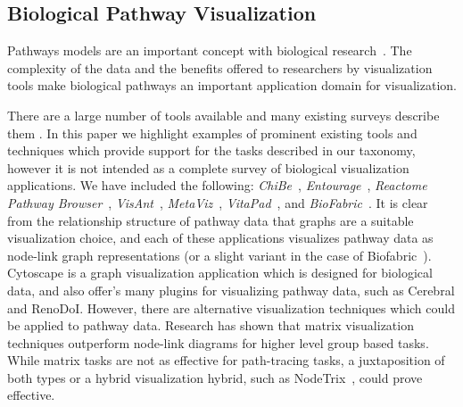 \subsection*{Biological Pathway Visualization}


Pathways models are an important concept with biological research~\cite{cairns2011regulation, luo2003targeting,reya2001stem}.
The complexity of the data and the benefits offered to researchers by visualization tools make biological pathways an important application domain for visualization.


There are a large number of tools available and many existing surveys describe them \cite{Suderman2007tools,pavlopoulos2008survey,Gehlenborg2010omics}.
In this paper we highlight examples of prominent existing tools and techniques which provide support for the tasks described in our taxonomy, however it is not intended as a complete survey of biological visualization applications.
We have included the following: \textit{ChiBe}~\cite{Babur2010chibe}, \textit{Entourage}~\cite{Lex2013entourage}, \textit{Reactome Pathway Browser}~\cite{croft2014reactome}, \textit{VisAnt}~\cite{hu2004visant}, \textit{MetaViz}~\cite{bourqui2007metabolic}, \textit{VitaPad}~\cite{holford2005vitapad}, and \textit{BioFabric}~\cite{Longabaugh2012biofabric}.
It is clear from the relationship structure of pathway data that graphs are a suitable visualization choice, and each of these applications visualizes pathway data as node-link graph representations (or a slight variant in the case of Biofabric~\cite{Longabaugh2012biofabric}).
Cytoscape \cite{cytoscape} is a graph visualization application which is designed for biological data, and also offer’s many plugins for visualizing pathway data, such as Cerebral\cite{Barsky2008cerebral} and RenoDoI\cite{Vehlow2015}.
However, there are alternative visualization techniques which could be applied to pathway data.
Research has shown that matrix visualization techniques outperform node-link diagrams for higher level group based tasks\cite{Ghoniem2004,Henry2007}.
While matrix tasks are not as effective for path-tracing tasks, a juxtaposition of both types or a hybrid visualization hybrid, such as NodeTrix~\cite{NodeTrix2007}, could prove effective.




